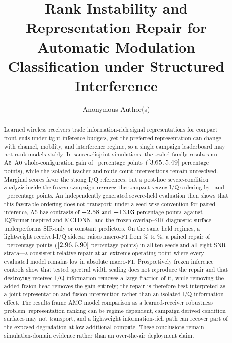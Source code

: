 \documentclass[letterpaper,journal]{IEEEtran}
\title{Rank Instability and Representation Repair for Automatic Modulation
Classification under Structured Interference}
\author{Anonymous Author(s)}
\newcommand{\pp}{percentage points}
\begin{document}
\maketitle

\begin{abstract}
Learned wireless receivers trade information-rich signal representations for
compact front ends under tight inference budgets, yet the preferred
representation can change with channel, mobility, and interference regime, so
a single campaign leaderboard may not rank models stably. In source-disjoint
simulations, the sealed family resolves an A5--A0 whole-configuration gain of
\MethodEffectDiff\ \pp\
($[3.65,5.49]$ \pp), while the isolated teacher
and route-count interventions remain unresolved. Marginal scores favor the
strong I/Q references, but a post-hoc severe-condition analysis inside the
frozen campaign reverses the compact-versus-I/Q ordering by
\SevereGainMcldnn\ and \SevereGainIqformer\ \pp. An independently generated
severe-held evaluation then shows that this favorable ordering does not
transport: under a seed-wise convention for paired inference, A5 has contrasts
of $-2.58$ and $-13.03$ \pp\
against IQFormer-inspired and MCLDNN, and the frozen overlap--SIR diagnostic surface
underperforms SIR-only or constant predictors. On the same held regimes, a
lightweight received-I/Q sidecar raises macro-F1 from \SevereRepairLevelAFive\%
to \SevereRepairLevelSidecar\%, a paired repair of \SevereRepairDiff\ \pp\
($[2.96,5.90]$ \pp) in all ten seeds and all
eight SNR strata---a consistent relative repair at an extreme operating point
where every evaluated model remains low in absolute macro-F1. Prospectively
frozen inference controls show that tested spectral width scaling does not
reproduce the repair and that destroying received-I/Q information removes a
large fraction of it, while removing the added fusion head removes the gain
entirely; the repair is therefore best interpreted as a joint
representation-and-fusion intervention rather than an isolated
I/Q-information effect. The results frame AMC model comparison as a
learned-receiver robustness problem: representation ranking can be
regime-dependent, campaign-derived condition surfaces may not transport, and a
lightweight information-rich path can recover part of the exposed degradation
at low additional compute. These conclusions remain simulation-domain evidence
rather than an over-the-air deployment claim.
\end{abstract}
\end{document}

